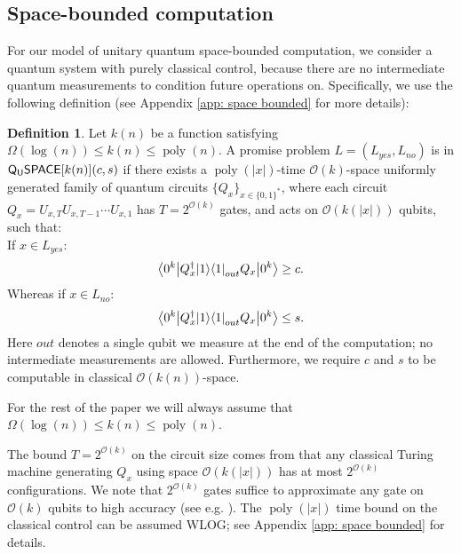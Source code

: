 \documentclass[11pt]{article}
\theoremstyle{definition}
\newtheorem{definition}[theorem]{Definition}
\theoremstyle{remark}
\newcommand\QSPACE{{\sf{Q_{U}SPACE}}}
\newcommand\bigoh{\mathcal{O}}
\DeclareMathOperator{\poly}{poly}
\begin{document}
\subsection{Space-bounded computation} \label{sec: space bounded computation}
For our model of unitary quantum space-bounded computation, we consider a quantum system with purely classical control, because there are no intermediate quantum measurements to condition future operations on. Specifically, we use the following definition (see Appendix \ref{app: space bounded} for more details):

\begin{definition} \label{def: qspace}
Let $k(n)$ be a function satisfying $\Omega(\log(n)) \le k(n) \le \poly(n)$. A promise problem $L=(L_{yes},L_{no})$ is in $\QSPACE[k(n)](c,s)$ if there exists a $\poly(|x|)$-time $\mathcal{O}(k)$-space uniformly generated family of quantum circuits $\{Q_x\}_{x\in\{0,1\}^*}$, where each circuit $Q_x=U_{x,T}U_{x,T-1}\cdots U_{x,1}$ has $T=2^{\mathcal{O}(k)}$ gates, and acts on $\mathcal{O}(k(|x|))$ qubits, such that:\\
 If $x \in L_{yes}$:
\begin{equation}
{\left\langle{0^k}\right\vert} Q^\dagger_x {\left\vert{1}\right\rangle}{\left\langle{1}\right\vert}_{out} Q_x {\left\vert{0^k}\right\rangle} \ge c.
\end{equation}
Whereas if $x \in L_{no}$:
\begin{equation}
{\left\langle{0^k}\right\vert} Q^\dagger_x {\left\vert{1}\right\rangle}{\left\langle{1}\right\vert}_{out} Q_x {\left\vert{0^k}\right\rangle} \le s.
\end{equation}
Here $out$ denotes a single qubit we measure at the end of the computation; no intermediate measurements are allowed.  
Furthermore, we require $c$ and $s$ to be computable in classical $\bigoh(k(n))$-space.
\end{definition}

For the rest of the paper we will always assume that $\Omega(\log(n)) \le k(n) \le \poly(n)$.

The bound $T=2^{\mathcal{O}(k)}$ on the circuit size comes from that any classical Turing machine generating $Q_x$ using space $\bigoh(k(|x|))$ has at most $2^{\mathcal{O}(k)}$ configurations. We note that $2^{\mathcal{O}(k)}$ gates suffice to approximate any gate on $\bigoh(k)$ qubits to high accuracy (see e.g. \cite[Chapter~4]{nc00}). The $\poly(|x|)$ time bound on the classical control can be assumed WLOG; see Appendix \ref{app: space bounded} for details.
\end{document}
